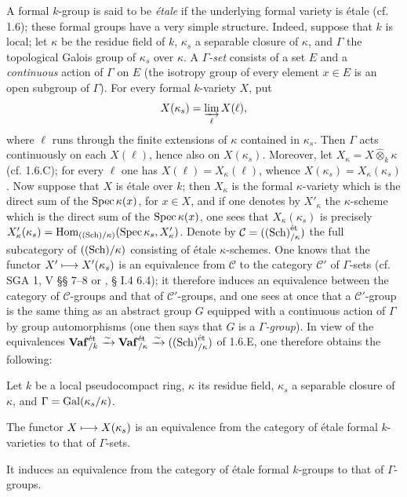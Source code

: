 A formal $k$-group is said to be \emph{étale} if the underlying formal variety is étale (cf. 1.6); these formal groups have a very simple structure. Indeed, suppose that $k$ is local; let $\kappa$ be the residue field of $k$, $\kappa_s$ a separable closure of $\kappa$, and $\Gamma$ the topological Galois group of $\kappa_s$ over $\kappa$. A \emph{$\Gamma$-set} consists of a set $E$ and a \emph{continuous} action of $\Gamma$ on $E$ (\ie the isotropy group of every element $x\in E$ is an open subgroup of $\Gamma$).
For every formal $k$-variety $X$, put
\[
X(\kappa_s)=\varinjlim_{\ell}X(\ell),
\]
where $\ell$ runs through the finite extensions of $\kappa$ contained in $\kappa_s$. Then $\Gamma$ acts continuously on each $X(\ell)$, hence also on $X(\kappa_s)$. Moreover, let $X_\kappa=X\widehat\otimes_k\kappa$ (cf. 1.6.C); for every $\ell$ one has $X(\ell)=X_\kappa(\ell)$, whence $X(\kappa_s)=X_\kappa(\kappa_s)$.
Now suppose that $X$ is étale over $k$; then $X_\kappa$ is the formal $\kappa$-variety which is the direct sum of the $\operatorname{Spec}\kappa(x)$, for $x\in X$, and if one denotes by $X'_\kappa$ the $\kappa$-scheme which is the direct sum of the $\operatorname{Spec}\kappa(x)$, one sees that $X_\kappa(\kappa_s)$ is precisely $X'_\kappa(\kappa_s)=\operatorname{Hom}_{(\textup{(Sch)}/\kappa)}(\operatorname{Spec}\kappa_s,X'_\kappa)$.
Denote by $\mathcal C=(\textup{(Sch)}_{/\kappa}^{\text{ét}})$ the full subcategory of $(\textup{(Sch)}/\kappa)$ consisting of étale $\kappa$-schemes. One knows that the functor $X'\longmapsto X'(\kappa_s)$ is an equivalence from $\mathcal C$ to the category $\mathcal C'$ of $\Gamma$-sets (cf. SGA 1, V §§ 7--8 or \cite{DG70}, § I.4 6.4); it therefore induces an equivalence between the category of $\mathcal C$-groups and that of $\mathcal C'$-groups, and one sees at once that a $\mathcal C'$-group is the same thing as an abstract group $G$ equipped with a continuous action of $\Gamma$ by group automorphisms (one then says that $G$ is a \emph{$\Gamma$-group}).
In view of the equivalences $\mathbf{Vaf}_{/k}^{\text{ét}}\xrightarrow{\sim}\mathbf{Vaf}_{/\kappa}^{\text{ét}}\xrightarrow{\sim}(\textup{(Sch)}_{/\kappa}^{\text{ét}})$ of 1.6.E, one therefore obtains the following:
\begin{proposition}{}
Let $k$ be a local pseudocompact ring, $\kappa$ its residue field, $\kappa_s$ a separable closure of $\kappa$, and $\Gamma=\operatorname{Gal}(\kappa_s/\kappa)$.
\begin{enumeratei}
\item The functor $X\longmapsto X(\kappa_s)$ is an equivalence from the category of étale formal $k$-varieties to that of $\Gamma$-sets.
\item It induces an equivalence from the category of étale formal $k$-groups to that of $\Gamma$-groups.
\end{enumeratei}
\end{proposition}
